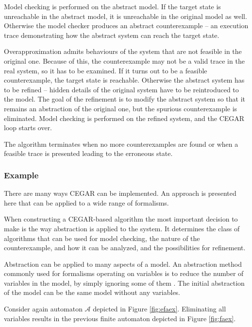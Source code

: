 Model checking is performed on the abstract model. If the target state is
unreachable in the abstract model, it is unreachable in the original model
as well. Otherwise the model checker produces an abstract counterexample -- an execution trace demonstrating how the abstract
system can reach the target state. 

Overapproximation admits behaviours of the system that are not feasible in the original one. Because of this, the counterexample may not be a valid trace in the real system, so it has to be examined.
If it turns out to be a feasible counterexample, the target state is reachable. Otherwise
the abstract system has to be refined -- hidden details of the original system have to be reintroduced to the model. The goal of the refinement is to modify the abstract
system so that it remains an abstraction of the original one, but the spurious
counterexample is eliminated.  Model checking is performed on the
refined system, and the CEGAR loop starts over. 

The algorithm terminates when no more
counterexamples are found or when a feasible trace is
presented leading to the erroneous state.

\subsubsection{Example} \label{sec:cegarex}

There are many ways CEGAR can be implemented. An approach is presented here that can be applied to a wide range of formalisms.

When constructing a CEGAR-based algorithm the most important decision to make is the way abstraction is applied to the system. It determines the class of algorithms that can be used for model checking, the nature of the counterexample, and how it can be analyzed, and the possibilities for refinement. 

 Abstraction can be applied to many aspects of a model. An abstraction method commonly used for formalisms operating on variables is to reduce the number of variables in the model, by simply ignoring some of them \cite{Clarke:1994:MCA}. The initial abstraction of the model can be the same model without any variables.
 
 \begin{example}
 	Consider again automaton $\mathcal{A}$ depicted in Figure \ref{fig:efaex}. Eliminating all variables results in the previous finite automaton depicted in Figure \ref{fig:faex}.
 \end{example}

